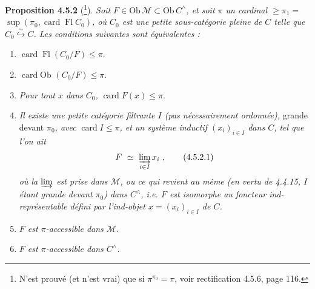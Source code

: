 \documentclass[11pt]{article}
\newcommand{\msp}[1]{\marginpar{\footnotesize [#1]}}
\newcommand{\Ob}{\mathrm{Ob}\,}
\newcommand{\card}{\operatorname{card}}
\newcommand{\Fl}{\operatorname{Fl}}
\begin{document}
\textbf{Proposition 4.5.2} (\footnote{N'est prouvé (et n'est vrai) que si $\pi^{\pi_0} = \pi$, voir rectification 4.5.6, page 116.}). \textit{Soit $F \in \Ob\mathcal{M} \subset \Ob C^{\wedge}$, et soit $\pi$ un cardinal $\geqslant \pi_1 =$} $\sup(\pi_0, \card\Fl C_0)$\textit{, où $C_0$ est une petite sous-catégorie pleine de $C$ telle que $C_0 \overset{\sim}{\hookrightarrow} C$. Les conditions suivantes sont équivalentes :}
\begin{enumerate}[leftmargin=3em]
\item[\textit{a)}] $\card\Fl(C_0/F) \leqslant \pi$.
\item[\textit{a$'$)}] $\card\Ob\,(C_0/F) \leqslant \pi$.
\item[\textit{a$''$)}] \textit{Pour tout $x$ dans $C_0$,} $\card F(x) \leqslant \pi$.
\item[\textit{b)}] \textit{Il existe une petite catégorie filtrante $I$ (pas nécessairement ordonnée),} grande devant $\pi_0$\textit{, avec} $\card I \leqslant \pi$\textit{, et un système inductif $(x_i)_{i\in I}$ dans $C$, tel que l'on ait}
\[
F \ \simeq\ \varinjlim_{i\in I} x_i\ ,
\tag*{(4.5.2.1)}
\]
\textit{où la $\varinjlim$ est prise dans $\mathcal{M}$, ou ce qui revient au même (en vertu de 4.4.15, $I$ étant grande devant $\pi_0$) dans $C^{\wedge}$, i.e. $F$ est isomorphe au foncteur ind-représentable défini par l'ind-objet $\underline{x} = (x_i)_{i\in I}$ de $C$.}
\item[\textit{c)}] \textit{$F$ est $\pi$-accessible dans $\mathcal{M}$.}
\item[\textit{c$'$)}] \textit{$F$ est $\pi$-accessible dans $C^{\wedge}$.}
\end{enumerate}
\msp{page 108}
\end{document}
